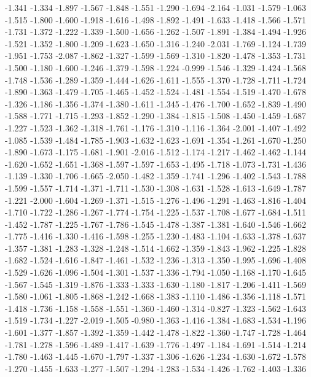 \documentclass[9pt]{article}
\theoremstyle{plain}
\theoremstyle{definition}
\theoremstyle{remark}
\numberwithin{equation}{section}
\begin{document}
-1.341
-1.334
-1.897
-1.567
-1.848
-1.551
-1.290
-1.694
-2.164
-1.031
-1.579
-1.063
-1.515
-1.800
-1.600
-1.918
-1.616
-1.498
-1.892
-1.491
-1.633
-1.418
-1.566
-1.571
-1.731
-1.372
-1.222
-1.339
-1.500
-1.656
-1.262
-1.507
-1.891
-1.384
-1.494
-1.926
-1.521
-1.352
-1.800
-1.209
-1.623
-1.650
-1.316
-1.240
-2.031
-1.769
-1.124
-1.739
-1.951
-1.753
-2.087
-1.862
-1.327
-1.599
-1.569
-1.310
-1.820
-1.478
-1.353
-1.731
-1.500
-1.180
-1.600
-1.246
-1.379
-1.598
-1.224
-0.999
-1.546
-1.329
-1.424
-1.568
-1.748
-1.536
-1.289
-1.359
-1.444
-1.626
-1.611
-1.555
-1.370
-1.728
-1.711
-1.724
-1.890
-1.363
-1.479
-1.705
-1.465
-1.452
-1.524
-1.481
-1.554
-1.519
-1.470
-1.678
-1.326
-1.186
-1.356
-1.374
-1.380
-1.611
-1.345
-1.476
-1.700
-1.652
-1.839
-1.490
-1.588
-1.771
-1.715
-1.293
-1.852
-1.290
-1.384
-1.815
-1.508
-1.450
-1.459
-1.687
-1.227
-1.523
-1.362
-1.318
-1.761
-1.176
-1.310
-1.116
-1.364
-2.001
-1.407
-1.492
-1.085
-1.539
-1.484
-1.785
-1.903
-1.632
-1.623
-1.691
-1.354
-1.261
-1.670
-1.250
-1.890
-1.673
-1.175
-1.681
-1.901
-2.016
-1.512
-1.174
-1.217
-1.462
-1.462
-1.144
-1.620
-1.652
-1.651
-1.368
-1.597
-1.597
-1.653
-1.495
-1.718
-1.073
-1.731
-1.436
-1.139
-1.330
-1.706
-1.665
-2.050
-1.482
-1.359
-1.741
-1.296
-1.402
-1.543
-1.788
-1.599
-1.557
-1.714
-1.371
-1.711
-1.530
-1.308
-1.631
-1.528
-1.613
-1.649
-1.787
-1.221
-2.000
-1.604
-1.269
-1.371
-1.515
-1.276
-1.496
-1.291
-1.463
-1.816
-1.404
-1.710
-1.722
-1.286
-1.267
-1.774
-1.754
-1.225
-1.537
-1.708
-1.677
-1.684
-1.511
-1.452
-1.787
-1.225
-1.767
-1.786
-1.545
-1.478
-1.387
-1.381
-1.640
-1.546
-1.662
-1.775
-1.416
-1.330
-1.416
-1.598
-1.255
-1.230
-1.483
-1.104
-1.633
-1.378
-1.637
-1.357
-1.381
-1.283
-1.328
-1.248
-1.514
-1.662
-1.359
-1.843
-1.962
-1.225
-1.828
-1.682
-1.524
-1.616
-1.847
-1.461
-1.532
-1.236
-1.313
-1.350
-1.995
-1.696
-1.408
-1.529
-1.626
-1.096
-1.504
-1.301
-1.537
-1.336
-1.794
-1.050
-1.168
-1.170
-1.645
-1.567
-1.545
-1.319
-1.876
-1.333
-1.333
-1.630
-1.180
-1.817
-1.206
-1.411
-1.569
-1.580
-1.061
-1.805
-1.868
-1.242
-1.668
-1.383
-1.110
-1.486
-1.356
-1.118
-1.571
-1.418
-1.736
-1.158
-1.558
-1.551
-1.360
-1.460
-1.314
-0.827
-1.323
-1.562
-1.643
-1.519
-1.734
-1.227
-2.019
-1.505
-0.980
-1.363
-1.416
-1.384
-1.683
-1.534
-1.196
-1.601
-1.377
-1.857
-1.392
-1.359
-1.442
-1.478
-1.822
-1.360
-1.747
-1.728
-1.464
-1.781
-1.278
-1.596
-1.489
-1.417
-1.639
-1.776
-1.497
-1.184
-1.691
-1.514
-1.214
-1.780
-1.463
-1.445
-1.670
-1.797
-1.337
-1.306
-1.626
-1.234
-1.630
-1.672
-1.578
-1.270
-1.455
-1.633
-1.277
-1.507
-1.294
-1.283
-1.534
-1.426
-1.762
-1.403
-1.336
\end{document}
